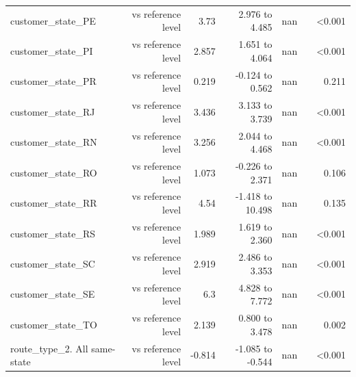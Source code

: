 \begin{table}[htbp]
\begin{tabular}{lrrrrrr}
customer\_state\_PE & vs reference level & 3.73 & 2.976 to 4.485 & nan &  & <0.001 \\
customer\_state\_PI & vs reference level & 2.857 & 1.651 to 4.064 & nan &  & <0.001 \\
customer\_state\_PR & vs reference level & 0.219 & -0.124 to 0.562 & nan &  & 0.211 \\
customer\_state\_RJ & vs reference level & 3.436 & 3.133 to 3.739 & nan &  & <0.001 \\
customer\_state\_RN & vs reference level & 3.256 & 2.044 to 4.468 & nan &  & <0.001 \\
customer\_state\_RO & vs reference level & 1.073 & -0.226 to 2.371 & nan &  & 0.106 \\
customer\_state\_RR & vs reference level & 4.54 & -1.418 to 10.498 & nan &  & 0.135 \\
customer\_state\_RS & vs reference level & 1.989 & 1.619 to 2.360 & nan &  & <0.001 \\
customer\_state\_SC & vs reference level & 2.919 & 2.486 to 3.353 & nan &  & <0.001 \\
customer\_state\_SE & vs reference level & 6.3 & 4.828 to 7.772 & nan &  & <0.001 \\
customer\_state\_TO & vs reference level & 2.139 & 0.800 to 3.478 & nan &  & 0.002 \\
route\_type\_2. All same-state & vs reference level & -0.814 & -1.085 to -0.544 & nan &  & <0.001 \\
\bottomrule
\end{tabular}
\par\smallskip\begin{minipage}{\linewidth}\footnotesize \end{minipage}
\end{table}

